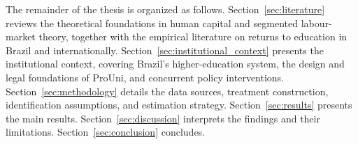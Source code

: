 The remainder of the thesis is organized as follows. Section~\ref{sec:literature} reviews the theoretical foundations in human capital and segmented labour-market theory, together with the empirical literature on returns to education in Brazil and internationally. Section~\ref{sec:institutional_context} presents the institutional context, covering Brazil's higher-education system, the design and legal foundations of ProUni, and concurrent policy interventions. Section~\ref{sec:methodology} details the data sources, treatment construction, identification assumptions, and estimation strategy. Section~\ref{sec:results} presents the main results. Section~\ref{sec:discussion} interprets the findings and their limitations. Section~\ref{sec:conclusion} concludes.
